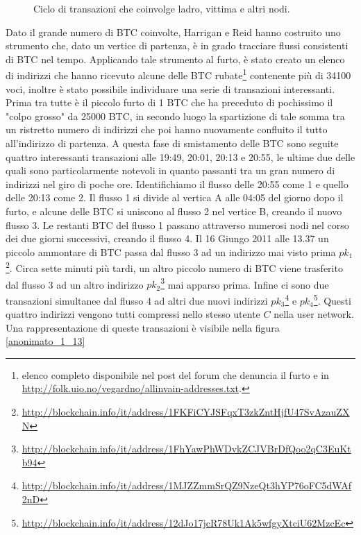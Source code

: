 \begin{figure}[htbp]
\centering
\caption{Ciclo di transazioni che coinvolge ladro, vittima e altri nodi.\label{anonimato_1_12}}
\end{figure}

Dato il grande numero di BTC coinvolte, Harrigan e Reid hanno costruito uno strumento che, dato un vertice di partenza, è in grado tracciare flussi consistenti di BTC nel tempo.
Applicando tale strumento al furto, è stato creato un elenco di indirizzi che hanno ricevuto alcune delle BTC rubate\footnote{elenco completo disponibile nel post del forum che denuncia il furto e in \url{http://folk.uio.no/vegardno/allinvain-addresses.txt}.} contenente più di 34100 voci, inoltre è stato possibile individuare una serie di transazioni interessanti.
Prima tra tutte è il piccolo furto di 1 BTC che ha preceduto di pochissimo il "colpo grosso" da 25000 BTC, in secondo luogo la spartizione di tale somma tra un ristretto numero di indirizzi che poi hanno nuovamente confluito il tutto all'indirizzo di partenza.
A questa fase di smistamento delle BTC sono seguite quattro interessanti transazioni alle 19:49, 20:01, 20:13 e 20:55, le ultime due delle quali sono particolarmente notevoli in quanto passanti tra un gran numero di indirizzi nel giro di poche ore.
Identifichiamo il flusso delle 20:55 come 1 e quello delle 20:13 come 2. Il flusso 1 si divide al vertica A alle 04:05 del giorno dopo il furto, e alcune delle BTC si uniscono al flusso 2 nel vertice B, creando il nuovo flusso 3. Le restanti BTC del flusso 1 passano attraverso numerosi nodi nel corso dei due giorni successivi, creando il flusso 4.
Il 16 Giungo 2011 alle 13.37 un piccolo ammontare di BTC passa dal flusso 3 ad un indirizzo mai visto prima $pk_1$\footnote{\url{http://blockchain.info/it/address/1FKFiCYJSFqxT3zkZntHjfU47SvAzauZXN}}. Circa sette minuti più tardi, un altro piccolo numero di BTC viene trasferito dal flusso 3 ad un altro indirizzo $pk_2$\footnote{\url{http://blockchain.info/it/address/1FhYawPhWDvkZCJVBrDfQoo2qC3EuKtb94}} mai apparso prima. Infine ci sono due transazioni simultanee dal flusso 4 ad altri due nuovi indirizzi $pk_3$\footnote{\url{http://blockchain.info/it/address/1MJZZmmSrQZ9NzeQt3hYP76oFC5dWAf2nD}} e $pk_4$\footnote{\url{http://blockchain.info/it/address/12dJo17jcR78Uk1Ak5wfgyXtciU62MzcEc}}. Questi quattro indirizzi vengono tutti compressi nello stesso utente $C$ nella user network. Una rappresentazione di queste transazioni è visibile nella figura \ref{anonimato_1_13}

